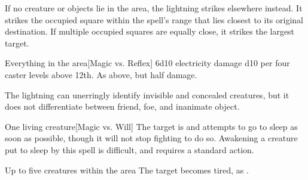 \begin{spellheader}
    \spellrng{\rngext}
    \spellspecial If no creature or objects lie in the area, the lightning strikes elsewhere instead. It strikes the  occupied square within the spell's range that lies closest to its original destination. If multiple occupied squares are equally close, it strikes the largest target.
\end{spellheader}
\begin{spelleffects}
    \begin{spelltargets}{Everything in the area}[Magic vs. Reflex]
        \spellsuccess 6d10 electricity damage \add d10 per four caster levels above 12th.
        \spellfailure As above, but half damage.
    \end{spelltargets}
\end{spelleffects}
\begin{spellfooter}
    \spellnotes The lightning can unerringly identify invisible and concealed creatures, but it does not differentiate between friend, foe, and inanimate object.
\end{spellfooter}

\begin{spellheader}
    \spellrng{\rngmed}
    \spelldur{\durshort}
\end{spellheader}
\begin{spelleffects}
    \begin{spelltarget}{One living creature}[Magic vs. Will]
        \spellsuccess The target is \fatigued and attempts to go to sleep as soon as possible, though it will not stop fighting to do so. Awakening a creature put to sleep by this spell is difficult, and requires a standard action.
    \end{spelltarget}
\end{spelleffects}

\begin{spellheader}
    \spelldur{\durshort}
\end{spellheader}
\begin{spelleffects}
    \begin{spelltargets}{Up to five creatures within the area}
        \spellsuccess The target becomes tired, as .
    \end{spelltargets}
\end{spelleffects}

